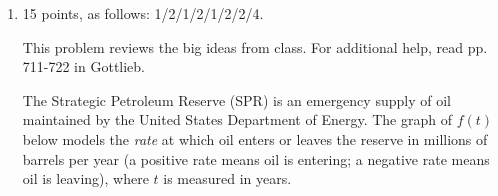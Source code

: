 \documentclass{article}
\begin{document}
\begin{enumerate}




        

    


\item 

\begin{grading}
 15 points, as follows: 1/2/1/2/1/2/2/4.
\end{grading}

This problem reviews the big ideas from class.  For additional help, read pp. 711-722 in Gottlieb.

  The Strategic Petroleum Reserve (SPR) is an emergency supply of oil
  maintained by the United States Department of Energy. The graph of $f(t)$ below models the \emph{rate} at which oil enters or leaves the reserve in
  millions of barrels per year (a positive rate means oil is entering; a
  negative rate means oil is leaving), where $t$ is measured in years. 


\end{enumerate}
\end{document}

